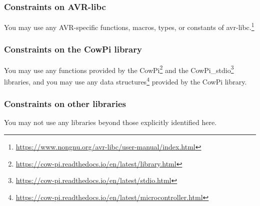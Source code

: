 \subsubsection{Constraints on AVR-libc}

You may use any AVR-specific functions, macros, types, or constants of avr-libc.\footnote{
    \url{https://www.nongnu.org/avr-libc/user-manual/index.html}
}

\subsubsection{Constraints on the CowPi library}

You may use any functions provided by the CowPi\footnote{
    \url{https://cow-pi.readthedocs.io/en/latest/library.html}
}
and the CowPi\_stdio\footnote{
    \url{https://cow-pi.readthedocs.io/en/latest/stdio.html}
} libraries,
and you may use any data structures\footnote{
    \url{https://cow-pi.readthedocs.io/en/latest/microcontroller.html}
} provided by the CowPi library.


\subsubsection{Constraints on other libraries}

You may not use any libraries beyond those explicitly identified here.
